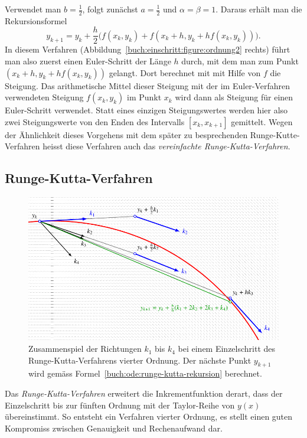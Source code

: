 Verwendet man $b=\frac12$, folgt zunächst $a=\frac12$ und $\alpha=\beta=1$.
Daraus erhält man die Rekursionsformel
\begin{equation}
y_{k+1}=y_k+\frac{h}2\biggl(
f(x_k,y_k) + f(x_k+h, y_k + hf(x_k,y_k))
\biggr).
\label{buch:ode:simplified-runge-kutta}
\end{equation}
In diesem Verfahren
(Abbildung~\ref{buch:einschritt:figure:ordnung2} rechts)
führt man also zuerst einen Euler-Schritt der Länge
$h$ durch, mit dem man zum Punkt $(x_k+h, y_k+hf(x_k,y_k))$ gelangt.
Dort berechnet mit mit Hilfe von $f$ die Steigung.
Das arithmetische Mittel dieser Steigung mit der im Euler-Verfahren
verwendeten Steigung $f(x_k,y_k)$ im Punkt $x_k$ wird dann als
Steigung für einen Euler-Schritt verwendet.
Statt eines einzigen Steigungswertes werden hier also zwei Steigungswerte
von den Enden des Intervalls $[x_k,x_{k+1}]$ gemittelt.
Wegen der Ähnlichkeit dieses Vorgehens mit dem später zu besprechenden
Runge-Kutte-Verfahren heisst diese Verfahren auch das
{\em vereinfachte Runge-Kutta-Verfahren}.
%
%

\subsection{Runge-Kutta-Verfahren\label{subsection:buch:ode:runge-kutta}}
%
\begin{figure}
\centering
\includegraphics{chapters/50-ode/figures/rungekutta.pdf}
\caption{Zusammenspiel der Richtungen $k_1$ bis $k_4$ bei einem
Einzelschritt des Runge-Kutta-Verfahrens vierter Ordnung.
Der nächste Punkt $y_{k+1}$ wird gemäss
Formel~\eqref{buch:ode:runge-kutta-rekursion} berechnet.
%
\label{buch:ode:rk-step}}
\end{figure}
Das {\em Runge-Kutta-Verfahren} erweitert die Inkrementfunktion derart,
dass der Einzelschritt bis zur fünften Ordnung mit der Taylor-Reihe von
$y(x)$ übereinstimmt.
%
%
So entsteht ein Verfahren vierter Ordnung, es stellt einen guten Kompromiss
zwischen Genauigkeit und Rechenaufwand dar.
%
%

